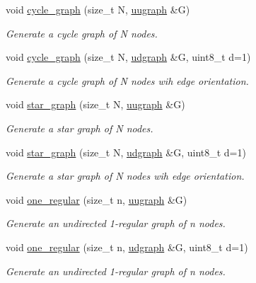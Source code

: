 \begin{DoxyCompactItemize}
void \hyperlink{namespacelgraph_1_1networks_1_1classic_abb5f4e0818cb76a434a8881dd84564cb}{cycle\+\_\+graph} (size\+\_\+t N, \hyperlink{classlgraph_1_1uugraph}{uugraph} \&G)
\begin{DoxyCompactList}\small\item\em Generate a cycle graph of {\itshape N} nodes. \end{DoxyCompactList}\item 
void \hyperlink{namespacelgraph_1_1networks_1_1classic_a3fdc2b19840d4727d4bd5ec434b3fabc}{cycle\+\_\+graph} (size\+\_\+t N, \hyperlink{classlgraph_1_1udgraph}{udgraph} \&G, uint8\+\_\+t d=1)
\begin{DoxyCompactList}\small\item\em Generate a cycle graph of {\itshape N} nodes wih edge orientation. \end{DoxyCompactList}\item 
void \hyperlink{namespacelgraph_1_1networks_1_1classic_a98b55be442b4c178e4359dd0cdb534fe}{star\+\_\+graph} (size\+\_\+t N, \hyperlink{classlgraph_1_1uugraph}{uugraph} \&G)
\begin{DoxyCompactList}\small\item\em Generate a star graph of {\itshape N} nodes. \end{DoxyCompactList}\item 
void \hyperlink{namespacelgraph_1_1networks_1_1classic_a7a659f0085a30b2801bb0efd31e8d084}{star\+\_\+graph} (size\+\_\+t N, \hyperlink{classlgraph_1_1udgraph}{udgraph} \&G, uint8\+\_\+t d=1)
\begin{DoxyCompactList}\small\item\em Generate a star graph of {\itshape N} nodes wih edge orientation. \end{DoxyCompactList}\item 
void \hyperlink{namespacelgraph_1_1networks_1_1classic_a7177ab266c5b173513fb9a28b98c05f5}{one\+\_\+regular} (size\+\_\+t n, \hyperlink{classlgraph_1_1uugraph}{uugraph} \&G)
\begin{DoxyCompactList}\small\item\em Generate an undirected 1-\/regular graph of {\itshape n} nodes. \end{DoxyCompactList}\item 
void \hyperlink{namespacelgraph_1_1networks_1_1classic_aa21699973ba38f018893ad61babcfaa3}{one\+\_\+regular} (size\+\_\+t n, \hyperlink{classlgraph_1_1udgraph}{udgraph} \&G, uint8\+\_\+t d=1)
\begin{DoxyCompactList}\small\item\em Generate an undirected 1-\/regular graph of {\itshape n} nodes. \end{DoxyCompactList}\end{DoxyCompactItemize}


